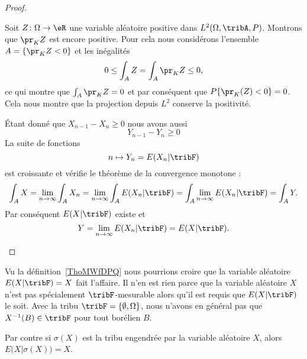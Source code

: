 \begin{proof}
\begin{subproof}
            Soit \( Z\colon \Omega\to \eR\) une variable aléatoire positive dans \( L^2(\Omega,\tribA,P)\). Montrons que \( \pr_KZ\) est encore positive. Pour cela nous considérons l'ensemble \( A=\{ \pr_KZ<0 \}\) et les inégalités
            \begin{equation}
                0\leq \int_AZ=\int_A\pr_KZ\leq 0,
            \end{equation}
            ce qui montre que \( \int_A\pr_KZ=0\) et par conséquent que \( P\{ \pr_K(Z)<0 \}=0\). Cela nous montre que la projection depuis \( L^2\) conserve la positivité.

            Étant donné que \( X_{n-1}-X_n\geq 0\) nous avons aussi
            \begin{equation}
                Y_{n-1}-Y_{n}\geq 0
            \end{equation}
            La suite de fonctions
            \begin{equation}
                n\mapsto Y_n=E(X_n|\tribF)
            \end{equation}
            est croissante et vérifie le théorème de la convergence monotone :
            \begin{equation}
                    \int_A X=\lim_{n\to \infty} \int_A X_n =\lim_{n\to \infty} \int_A E(X_n|\tribF)=\int_A\lim_{n\to \infty } E(X_n|\tribF)=\int_A Y.
            \end{equation}
            Par conséquent \( E(X|\tribF)\) existe et
            \begin{equation}
                Y=\lim_{n\to \infty} E(X_n|\tribF)=E(X|\tribF).
            \end{equation}
    \end{subproof}
\end{proof}

\begin{normaltext}      \label{NORMooHPHOooUuJWHR}
    Vu la définition~\ref{ThoMWfDPQ} nous pourrions croire que la variable aléatoire \( E(X|\tribF)=X\) fait l'affaire. Il n'en est rien parce que la variable aléatoire \( X\) n'est pas spécialement \( \tribF\)-mesurable alors qu'il est requis que \( E(X|\tribF)\) le soit. Avec la tribu \( \tribF=\{ \emptyset,\Omega \}\), nous n'avons en général pas que \( X^{-1}(B)\in \tribF\) pour tout borélien \( B\).

    Par contre si \( \sigma(X)\) est la tribu engendrée par la variable aléatoire \( X\), alors \( E\big( X |\sigma(X) \big)=X\).
\end{normaltext}

